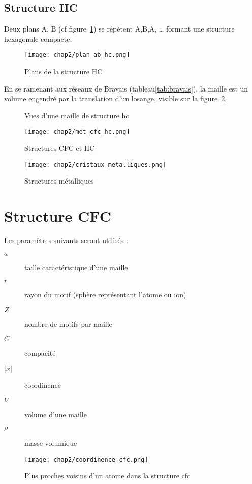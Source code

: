\subsection{Structure HC}
Deux plans A, B (cf figure~\ref{fig:plan_ab_hc}) se répètent A,B,A, \dots
formant une structure hexagonale compacte.
\begin{figure}
    \centering
    \texttt{[image: chap2/plan\_ab\_hc.png]}
    \caption{Plans de la structure HC}\label{fig:plan_ab_hc}
\end{figure}
En se ramenant aux réseaux de Bravais (tableau\ref{tab:bravais}),
la maille est un volume engendré par la translation d'un losange,
visible sur la figure~\ref{fig:maille_hc}.
\begin{figure}
    \centering
    \qquad
    \caption{Vues d'une maille de structure hc}\label{fig:maille_hc}
\end{figure}

\begin{figure}
    \centering
    \texttt{[image: chap2/met\_cfc\_hc.png]}
    \caption{Structures CFC et HC}
\end{figure}
\begin{figure}
    \centering
    \texttt{[image: chap2/cristaux\_metalliques.png]}
    \caption{Structures métalliques}
\end{figure}


\section{Structure CFC}
Les paramètres suivants seront utilisés :
\begin{description}
    \item[$a$] taille caractéristique d'une maille
    \item[$r$] rayon du motif (sphère représentant l'atome ou ion)
    \item[$Z$] nombre de motifs par maille
    \item[$C$] compacité
    \item[$\lbrack x \rbrack$] coordinence
    \item[$V$] volume d'une maille
    \item[$\rho$] masse volumique
\end{description}
\begin{figure}
    \centering
    \texttt{[image: chap2/coordinence\_cfc.png]}
    \caption{Plus proches voisins d'un atome dans la
        structure cfc}\label{fig:coordinence_cfc}
\end{figure}
